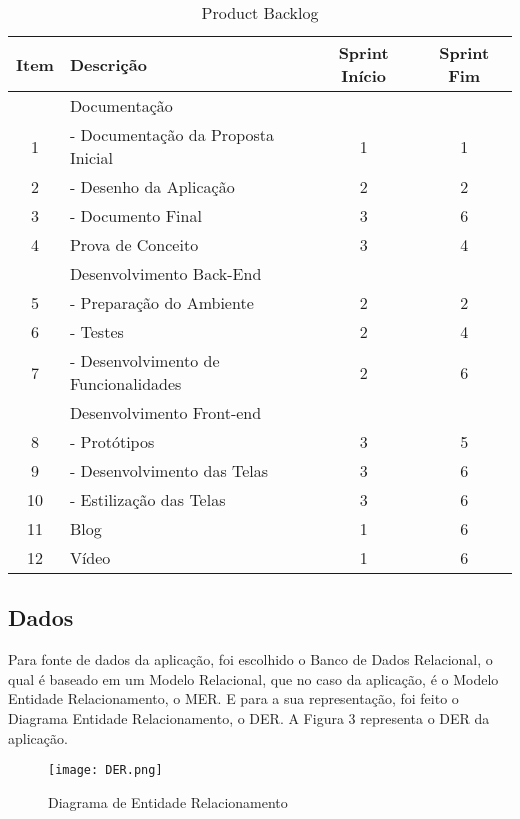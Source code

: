 \documentclass[
    12pt,               %
    openright,          %
    oneside,
    a4paper,            %
    paginasA3,  %
    MODELO,             %
    TODO,               %
    english,            %
    brazil              %
    ]{ifsp-spo-inf-ctds} %
\begin{document}
\ABNTEXfontereduzida
\begin{table}[htb]
\centering
\caption{Product Backlog}
\label{tab-exemplo}
\begin{tabular}{| c | l | c | c |}
    \hline
     Item & Descrição & Sprint Início & Sprint Fim  \\
    \hline  
      & Documentação &  &   \\
    \hline  
     1 & - Documentação da Proposta Inicial & 1 & 1  \\
    \hline
     2 & - Desenho da Aplicação & 2 & 2  \\
    \hline
     3 & - Documento Final & 3 & 6 \\
    \hline
     4 & Prova de Conceito & 3 & 4 \\
    \hline
      & Desenvolvimento Back-End &  &   \\
    \hline
     5 & - Preparação do Ambiente & 2 & 2  \\
    \hline
     6 & - Testes & 2 &  4 \\
    \hline
     7 & - Desenvolvimento de Funcionalidades & 2 & 6  \\
    \hline
      & Desenvolvimento Front-end &  &    \\
    \hline
     8 & - Protótipos & 3 & 5 \\
    \hline
     9 & - Desenvolvimento das Telas & 3 &  6 \\
    \hline
     10 & - Estilização das Telas & 3 &  6 \\
    \hline
     11 &  Blog & 1 & 6  \\
    \hline
     12 &  Vídeo & 1 & 6  \\
   \hline
\end{tabular}
\end{table}
\FloatBarrier

\subsection{Dados}
Para fonte de dados da aplicação, foi escolhido o Banco de Dados Relacional, o qual é baseado em um Modelo Relacional, que no caso da aplicação, é o Modelo Entidade Relacionamento, o MER. E para a sua representação, foi feito o Diagrama Entidade Relacionamento, o DER. A Figura 3 representa o DER da aplicação.

\begin{figure}[htb]
    \centering
	\texttt{[image: DER.png]}
	\caption{\label{recompensa} Diagrama de Entidade Relacionamento}
\end{figure}
\FloatBarrier
\end{document}

